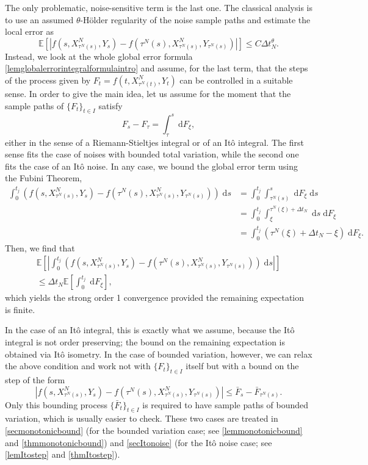 \documentclass[reqno,12pt]{amsart}
\theoremstyle{plain}%
\theoremstyle{definition}
\begin{document}
The only problematic, noise-sensitive term is the last one. The classical analysis is to use an assumed $\theta$-H\"older regularity of the noise sample paths and estimate the local error as
\[
    \mathbb{E}\left[\left|f(s, X_{\tau^N(s)}^N, Y_s) - f(\tau^N(s), X_{\tau^N(s)}^N, Y_{\tau^N(s)})\right|\right] \leq C\Delta t_N^{\theta}.
\]
Instead, we look at the whole global error formula \eqref{lemglobalerrorintegralformulaintro} and assume, for the last term, that the steps of the process given by $F_t = f(t, X_{\tau^N(t)}^N, Y_t)$ can be controlled in a suitable sense. In order to give the main idea, let us assume for the moment that the sample paths of $\{F_t\}_{t\in I}$ satisfy
\[
    F_s - F_\tau = \int_\tau^s \;\mathrm{d}F_\xi,
\]
either in the sense of a Riemann-Stieltjes integral or of an It\^o integral. The first sense fits the case of noises with bounded total variation, while the second one fits the case of an It\^o noise. In any case, we bound the global error term using the Fubini Theorem,
\begin{align*}
    \int_0^{t_j} \left( f(s, X_{\tau^N(s)}^N, Y_s) - f(\tau^N(s), X_{\tau^N(s)}^N, Y_{\tau^N(s)}) \right)\;\mathrm{d}s & = \int_0^{t_j} \int_{\tau^N(s)}^s \;\mathrm{d}  F_\xi\;\mathrm{d}s \\
    & = \int_0^{t_j} \int_{\xi}^{\tau^N(\xi) + \Delta t_N} \;\mathrm{d}s \;\mathrm{d} F_\xi \\
    & = \int_0^{t_j} (\tau^N(\xi) + \Delta t_N - \xi) \;\mathrm{d} F_\xi.
\end{align*}
Then, we find that
\begin{multline*}
    \mathbb{E}\left[\left| \int_0^{t_j} \left( f(s, X_{\tau^N(s)}^N, Y_s) - f(\tau^N(s), X_{\tau^N(s)}^N, Y_{\tau^N(s)}) \right)\;\mathrm{d}s\right|\right] \\
    \leq \Delta t_N \mathbb{E}\left[\int_0^{t_j} \;\mathrm{d} F_\xi\right],
\end{multline*}
which yields the strong order 1 convergence provided the remaining expectation is finite.

In the case of an It\^o integral, this is exactly what we assume, because the It\^o integral is not order preserving; the bound on the remaining expectation is obtained via It\^o isometry. In the case of bounded variation, however, we can relax the above condition and work not with $\{F_t\}_{t\in I}$ itself but with a bound on the step of the form
\[
    |f(s, X_{\tau^N(s)}^N, Y_s) - f(\tau^N(s), X_{\tau^N(s)}^N, Y_{\tau^N(s)})| \leq \bar F_s - \bar F_{\tau^N(s)}.
\]
Only this bounding process $\{\bar F_t\}_{t\in I}$ is required to have sample paths of bounded variation, which is usually easier to check. These two cases are treated in \cref{secmonotonicbound} (for the bounded variation case; see \cref{lemmonotonicbound} and \cref{thmmonotonicbound}) and \cref{secItonoise} (for the It\^o noise case; see \cref{lemItostep} and \cref{thmItostep}).
\end{document}
